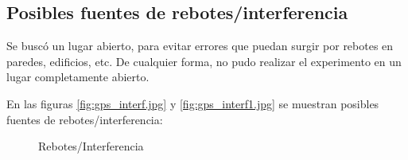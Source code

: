 \documentclass[spanish,12pt,a4paper,titlepage]{report}
\begin{document}
\newpage

\subsection{Posibles fuentes de rebotes/interferencia}
\label{sec:posibles-fuentes-de-rebotes-interferencia}

Se buscó un lugar abierto, para evitar errores que puedan surgir por rebotes en paredes, edificios, etc. De cualquier forma, no pudo realizar el experimento en un lugar completamente abierto.

En las figuras \ref{fig:gps_interf.jpg} y \ref{fig:gps_interf1.jpg} se muestran posibles fuentes de rebotes/interferencia:

\begin{figure} [h!]
  \centering
  \caption{Rebotes/Interferencia}
  \label{fig:rebotes}
\end{figure}
\end{document}
